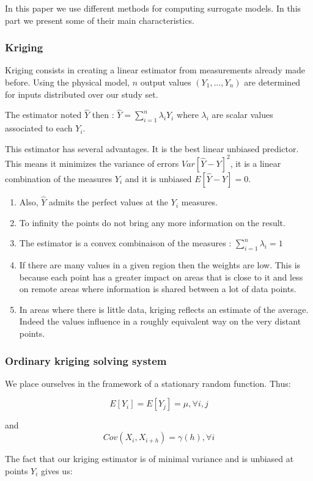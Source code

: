 \documentclass[hidelinks,12pt]{article}
\begin{document}
In this paper we use different methods for computing surrogate models. In this part we present some of their main characteristics.


\subsubsection{Kriging}

Kriging consists in creating a linear estimator from measurements already made before. Using the physical model, $n$ output values $(Y_1,\ldots,Y_n)$ are determined for inputs distributed over our study set. 

The estimator noted $\hat{Y}$ then : $\hat{Y}=\sum_{i=1}^{n}\lambda_i Y_i$ where $\lambda_i$ are scalar values associated to each $Y_i$.

This estimator has several advantages. It is the best linear unbiased predictor. This means it minimizes the variance of errors $Var[\hat{Y}-Y]^2$, it is a linear combination of the measures $Y_i$ and it is unbiased $E[\hat{Y}-Y]=0$.
\begin{enumerate}
\item Also, $\hat{Y}$ admits the perfect values at the $Y_i$ measures.
\item To infinity the points do not bring any more information on the result.
\item The estimator is a convex combinaison of the measures : $\sum_{i=1}^{n}\lambda_i=1$
\item If there are many values in a given region then the weights are low. This is because each point has a greater impact on areas that is close to it and less on remote areas where information is shared between a lot of data points.
\item In areas where there is little data, kriging reflects an estimate of the average. Indeed the values influence in a roughly equivalent way on the very distant points.
\end{enumerate}

\subsubsection{Ordinary kriging solving system}
We place ourselves in the framework of a stationary random function. Thus:

$$E[Y_i]=E[Y_j]=\mu, \forall i,j$$

and $$Cov(X_i,X_{i+h})=\gamma(h), \forall i$$

The fact that our kriging estimator is of minimal variance and is unbiased at points $Y_i$ gives us:
\end{document}
